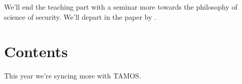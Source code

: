 We'll end the teaching part with a seminar more towards the philosophy of 
science of security.
We'll depart in the paper 
\autocite{SecurityAsAScience} by
\citeauthor{SecurityAsAScience}.


\section{Contents}

\begin{frame}
  \begin{remark}
    This year we're syncing more with TAMOS.
  \end{remark}
\end{frame}

%

